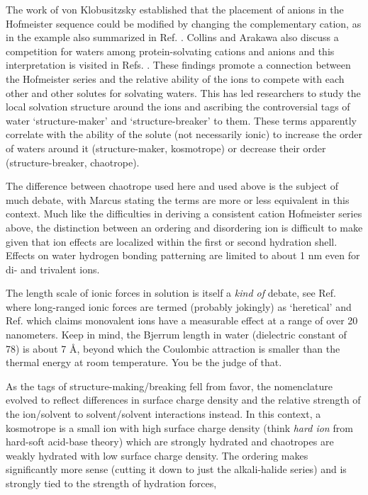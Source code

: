 \begin{intro}
    The work of von Klobusitzsky established that the placement of anions in the Hofmeister sequence could be modified by changing the complementary cation, as in the example
    also summarized in Ref. \cite{abernethy1967franz}. Collins\cite{collins1985hofmeister,collins1995,collins2004ions,collins2007review} and Arakawa\cite{arakawa1984mechanism} also
    discuss a competition for waters among protein-solvating cations and anions and this interpretation is visited in Refs. \cite{ball2015water,marcus2009effect}. These findings 
    promote a connection between the Hofmeister series and the relative ability of the ions to compete with each other and other solutes for solvating waters. This has led researchers
    to study the local solvation structure around the ions and ascribing the controversial tags of water `structure-maker' and `structure-breaker' to them. These terms apparently 
    correlate with the ability of the solute (not necessarily ionic) to increase the order of waters around it (structure-maker, kosmotrope) or decrease their order (structure-breaker, 
    chaotrope). 
    
    The difference between chaotrope used here and used above is the subject of much debate\cite{ball2015water,marcus2009effect}, with Marcus stating the terms are more or less 
    equivalent in this context. Much like the difficulties in deriving a consistent cation Hofmeister series above, the distinction between an ordering and disordering ion is 
    difficult to make given that ion effects are localized within the first or second hydration 
    shell\cite{collins2007review,williams2012nanodrops,jungwirth2013hofmeister,jungwirth2014beyond,ninham2011review,saha2016impact}. 
    Effects on water hydrogen bonding patterning are limited to about 1 nm even for di- and trivalent ions\cite{williams2012nanodrops,williams2015trivalent,williams2015crystal}. 
    
    The length scale of ionic forces in solution is itself a \emph{kind of} debate, see Ref. \cite{ninham2011review} where long-ranged ionic forces are termed (probably jokingly)
    as `heretical' and Ref. \cite{chen2016electrolytes} which claims monovalent ions have a measurable effect at a range of over 20 nanometers. Keep in mind, the Bjerrum length in 
    water (dielectric constant of 78) is about 7 \AA, beyond which the Coulombic attraction is smaller than the thermal energy at room temperature. You be the judge of that.
     
    As the tags of structure-making/breaking fell from favor, the nomenclature evolved to reflect differences in surface charge density and the relative strength of the ion/solvent 
    to solvent/solvent interactions instead. In this context, a kosmotrope is a small ion with high surface charge density (think \emph{hard ion} from hard-soft acid-base theory) which
    are strongly hydrated and chaotropes are weakly hydrated with low surface charge density. The ordering makes significantly more sense (cutting it down to just the alkali-halide
    series) and is strongly tied to the strength of hydration forces,
    

\end{intro}
